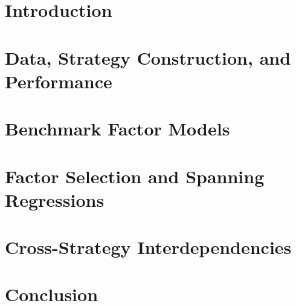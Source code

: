 \documentclass[12pt, oneside, letterpaper]{article}
\begin{document}


\clearpage
\begin{singlespace}
\hypersetup{linkcolor=black}
\tableofcontents
\clearpage
\listoftables
\clearpage
\listoffigures
\hypersetup{linkcolor=blue}
\end{singlespace}
\clearpage
\section*{Introduction}
\label{sec:introduction}


%

\section{Data, Strategy Construction, and Performance}
\label{sec:data}


\section{Benchmark Factor Models}
\label{sec:benchmarks}


\section{Factor Selection and Spanning Regressions}
\label{sec:factor_selection}


\section{Cross-Strategy Interdependencies}
\label{sec:interdependencies}


\section{Conclusion}
\label{sec:conclusion}


\clearpage
\begin{singlespace}

\end{singlespace}
\end{document}
